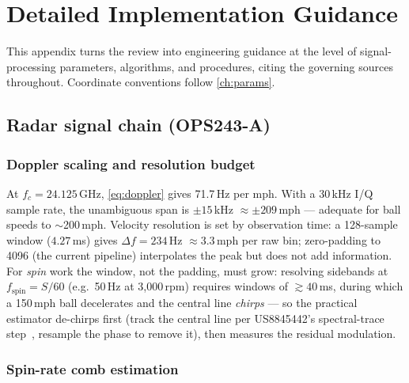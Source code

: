 \chapter{Detailed Implementation Guidance}
\label{app:impl}

This appendix turns the review into engineering guidance at the level of
signal-processing parameters, algorithms, and procedures, citing the
governing sources throughout. Coordinate conventions follow
\cref{ch:params}.

\section{Radar signal chain (OPS243-A)}
\label{app:radardsp}

\subsection{Doppler scaling and resolution budget}

At $f_c = 24.125$\,GHz, \cref{eq:doppler} gives 71.7\,Hz per mph. With
a 30\,kHz I/Q sample rate, the unambiguous span is
$\pm15$\,kHz $\approx \pm209$\,mph --- adequate for ball speeds to
$\sim$200\,mph. Velocity resolution is set by observation time:
a 128-sample window ($4.27$\,ms) gives $\Delta f = 234$\,Hz
$\approx3.3$\,mph per raw bin; zero-padding to 4096 (the current
pipeline) interpolates the peak but does not add information. For
\emph{spin} work the window, not the padding, must grow: resolving
sidebands at $f_{\mathrm{spin}} = S/60$ (e.g.\ 50\,Hz at 3,000\,rpm)
requires windows of $\gtrsim40$\,ms, during which a 150\,mph ball
decelerates and the central line \emph{chirps} --- so the practical
estimator de-chirps first (track the central line per
US8845442's spectral-trace step~\cite{us8845442}, resample the phase to
remove it), then measures the residual modulation.

\subsection{Spin-rate comb estimation}

